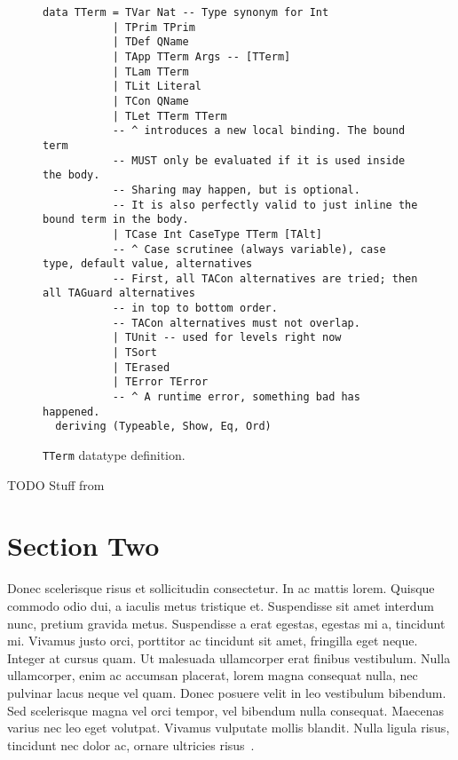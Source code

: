 \begin{figure}
\begin{lstlisting}[style=blockhaskell]
data TTerm = TVar Nat -- Type synonym for Int
           | TPrim TPrim
           | TDef QName
           | TApp TTerm Args -- [TTerm]
           | TLam TTerm
           | TLit Literal
           | TCon QName
           | TLet TTerm TTerm
           -- ^ introduces a new local binding. The bound term
           -- MUST only be evaluated if it is used inside the body.
           -- Sharing may happen, but is optional.
           -- It is also perfectly valid to just inline the bound term in the body.
           | TCase Int CaseType TTerm [TAlt]
           -- ^ Case scrutinee (always variable), case type, default value, alternatives
           -- First, all TACon alternatives are tried; then all TAGuard alternatives
           -- in top to bottom order.
           -- TACon alternatives must not overlap.
           | TUnit -- used for levels right now
           | TSort
           | TErased
           | TError TError
           -- ^ A runtime error, something bad has happened.
  deriving (Typeable, Show, Eq, Ord)
\end{lstlisting}
\caption{\lstinline{TTerm} datatype definition.}
\label{code:TTerm}
\end{figure}






TODO Stuff from \cite{abadi1991}


\section{Section Two}
\label{sec:section_two}

Donec scelerisque risus et sollicitudin consectetur. In ac mattis lorem. Quisque commodo odio dui, a iaculis metus tristique et. Suspendisse sit amet interdum nunc, pretium gravida metus. Suspendisse a erat egestas, egestas mi a, tincidunt mi. Vivamus justo orci, porttitor ac tincidunt sit amet, fringilla eget neque. Integer at cursus quam. Ut malesuada ullamcorper erat finibus vestibulum. Nulla ullamcorper, enim ac accumsan placerat, lorem magna consequat nulla, nec pulvinar lacus neque vel quam. Donec posuere velit in leo vestibulum bibendum. Sed scelerisque magna vel orci tempor, vel bibendum nulla consequat. Maecenas varius nec leo eget volutpat. Vivamus vulputate mollis blandit. Nulla ligula risus, tincidunt nec dolor ac, ornare ultricies risus~\cite{Schmidt1993aa}. \newline

